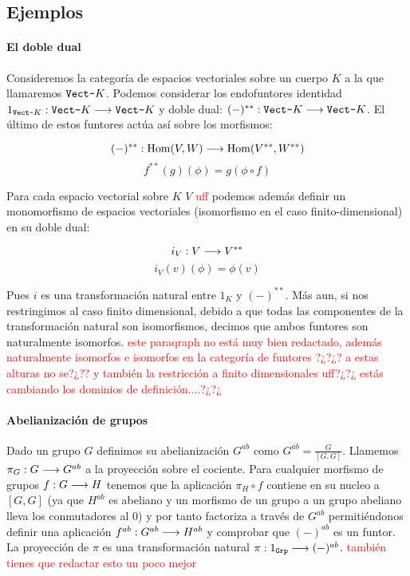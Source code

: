 \subsection{Ejemplos}
\paragraph{El doble dual}
Consideremos la categoría de espacios vectoriales sobre un cuerpo
$K$ a la que llamaremos $\texttt{Vect-}K$. Podemos considerar los endofuntores
identidad $1_{\texttt{Vect-}K} : \texttt{Vect-}K\longrightarrow \texttt{Vect-}K$ y  doble dual:
$(-)^{**} : \texttt{Vect-}K\longrightarrow \texttt{Vect-}K$. El último de estos funtores actúa
así sobre los morfismos:

$$(-)^{**} : \operatorname{Hom}(V, W)\longrightarrow \operatorname{Hom}(V^{**}, W^{**})$$
$$f^{**}(g)(\phi) = g(\phi \circ f)$$

Para cada espacio vectorial sobre $K$ $V$ \textcolor{red}{uff} podemos además
definir un monomorfismo de espacios vectoriales
 (isomorfismo
en el caso finito-dimensional) en su doble dual:

\begin{equation*}
i_V : V\longrightarrow V^{**}
\end{equation*}
\begin{equation*}
i_V(v)(\phi) = \phi(v)
\end{equation*}

Pues $i$ es una transformación natural entre $1_K$ y
$(-)^{**}$. Más aun, si nos restringimos al caso finito dimensional,
debido a que todas las componentes de la transformación natural
son isomorfismos, decimos que ambos funtores son naturalmente isomorfos. \textcolor{red}{este paraqraph no está muy bien redactado, además naturalmente isomorfos e isomorfos en la categoría de funtores ?¿?¿? a estas alturas no se?¿?? y también la restricción a finito dimensionales uff?¿?¿ estás cambiando los dominios de definición....?¿?¿}

\paragraph{Abelianización de grupos}
Dado un grupo $G$ definimos su abelianización $G^{ab}$ como
$G^{ab} = \frac{G}{[G, G]}$. Llamemos $\pi_G : G\longrightarrow G^{ab}$
a la proyección sobre el cociente. Para cualquier morfismo
de grupos $f : G\longrightarrow H$ tenemos que la aplicación
$\pi_H \circ f$ contiene en su nucleo a $[G, G]$ (ya que
$H^{ab}$ es abeliano y un morfismo de un grupo a un grupo abeliano
lleva los conmutadores al 0) y por tanto factoriza a través
de $G^{ab}$ permitiéndonos definir una aplicación
$f^{ab} : G^{ab}\longrightarrow H^{ab}$ y comprobar
que $(-)^{ab}$ es un funtor. La proyección de $\pi$ es una transformación
natural $\pi : 1_{\texttt{Grp}} \longrightarrow  (-)^{ab}$. \textcolor{red}{también tienes que redactar esto un poco mejor}
